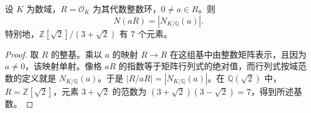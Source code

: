 \begin{lemma}\label{b3:lem:principal-ideal-norm}
	设 \(K\) 为数域，\(R=\mathcal O_K\) 为其代数整数环，\(0\ne a\in R\)。则
	\[
		N(aR)=|N_{K/\mathbb Q}(a)|.
	\]
	特别地，\(\mathbb Z[\sqrt2]/(3+\sqrt2)\) 有 \(7\) 个元素。
\end{lemma}
\begin{proof}
	取 \(R\) 的整基。乘以 \(a\) 的映射 \(R\longrightarrow R\) 在这组基中由整数矩阵表示，且因为 \(a\ne0\)，该映射单射。像格 \(aR\) 的指数等于矩阵行列式的绝对值，而行列式按域范数的定义就是 \(N_{K/\mathbb Q}(a)\)。于是 \(|R/aR|=|N_{K/\mathbb Q}(a)|\)。在 \(\mathbb Q(\sqrt2)\) 中，\(R=\mathbb Z[\sqrt2]\)，元素 \(3+\sqrt2\) 的范数为 \((3+\sqrt2)(3-\sqrt2)=7\)，得到所述基数。
\end{proof}
